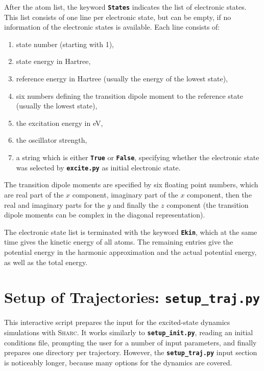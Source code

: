 \documentclass[a4paper,10pt,DIV=15,openany,twoside=false]{scrbook}
\newcommand{\sharc}{\textsc{Sharc}}
\newcommand{\ttt}[1]{\textbf{\texttt{#1}}}
\begin{document}
After the atom list, the keyword \ttt{States} indicates the list of electronic states. This list consists of one line per electronic state, but can be empty, if no information of the electronic states is available. Each line consists of: 
\begin{enumerate}
  \item state number (starting with 1),
  \item state energy in Hartree, 
  \item reference energy in Hartree (usually the energy of the lowest state),
  \item six numbers defining the transition dipole moment to the reference state (usually the lowest state),
  \item the excitation energy in eV,
  \item the oscillator strength,
  \item a string which is either \ttt{True} or \ttt{False}, specifying whether the electronic state was selected by \ttt{excite.py} as initial electronic state. 
\end{enumerate}
The transition dipole moments are specified by six floating point numbers, which are real part of the $x$ component, imaginary part of the $x$ component, then the real and imaginary parts for the $y$ and finally the $z$ component (the transition dipole moments can be complex in the diagonal representation). 

The electronic state list is terminated with the keyword \ttt{Ekin}, which at the same time gives the kinetic energy of all atoms. The remaining entries give the potential energy in the harmonic approximation and the actual potential energy, as well as the total energy.








\section{Setup of Trajectories: \ttt{setup\_traj.py}}\label{sec:setup_traj.py}

This interactive script prepares the input for the excited-state dynamics simulations with \sharc. It works similarly to \ttt{setup\_init.py}, reading an initial conditions file, prompting the user for a number of input parameters, and finally prepares one directory per trajectory. However, the \ttt{setup\_traj.py} input section is noticeably longer, because many options for the dynamics are covered.
\end{document}
